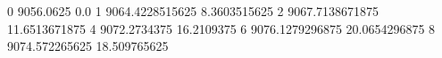 0 9056.0625 0.0
1 9064.4228515625 8.3603515625
2 9067.7138671875 11.6513671875
4 9072.2734375 16.2109375
6 9076.1279296875 20.0654296875
8 9074.572265625 18.509765625
